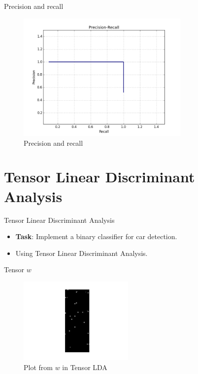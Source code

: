 \documentclass[handout]{beamer}
\begin{document}
\begin{frame}{Precision and recall}
    {\centering
    \begin{figure}[H]
        \includegraphics[width=0.75\textwidth]{project_03/precision.png}
        \caption{Precision and recall}
    \end{figure}
    }
\end{frame}

\section{Tensor Linear Discriminant Analysis}
\begin{frame}{Tensor Linear Discriminant Analysis}
    \begin{itemize}
        \item \textbf{Task}: Implement a binary classifier for car detection.
        \item Using Tensor Linear Discriminant Analysis.
    \end{itemize}
\end{frame}
\note{}

\begin{frame}{Tensor $w$}
    {\centering
    \begin{figure}[H]
        \includegraphics[width=0.50\textwidth]{project_03/WUnique.png}
        \caption{Plot from $w$ in Tensor LDA}
    \end{figure}
    }
\end{frame}


\end{document}
